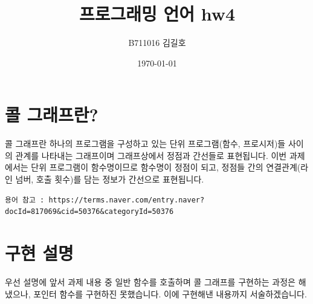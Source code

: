 \documentclass{article}
\title{프로그래밍 언어 hw4}
\author{B711016 김길호}
\date{\today}
\begin{document}
\maketitle
\newpage

\section{콜 그래프란?}
    콜 그래프란 하나의 프로그램을 구성하고 있는 단위 프로그램(함수, 프로시저)들 사이의 관계를 나타내는 그래프이며 그래프상에서 정점과 
    간선들로 표현됩니다. 이번 과제에서는 단위 프로그램이 함수명이므로 함수명이 정점이 되고, 정점들 간의 연결관계(라인 넘버, 호출 횟수)를 담는
    정보가 간선으로 표현됩니다.
    \begin{verbatim}
용어 참고 : https://terms.naver.com/entry.naver?docId=817069&cid=50376&categoryId=50376
    \end{verbatim}
\section{구현 설명}
    우선 설명에 앞서 과제 내용 중 일반 함수를 호출하며 콜 그래프를 구현하는 과정은 해냈으나, 포인터 함수를 구현하진 못했습니다. 이에 구현해낸 내용까지 서술하겠습니다. \\
\end{document}
